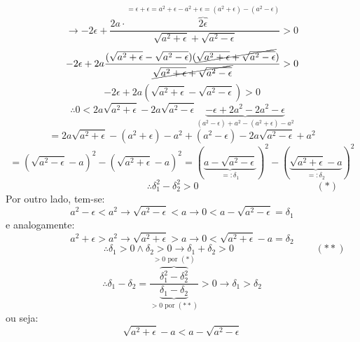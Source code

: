 \documentclass[a4paper, 12pt]{article}
\begin{document}
     \[
     \rightarrow -2\epsilon + \frac{2a \cdot \overbrace{2\epsilon}^{= \epsilon + \epsilon = a^2+\epsilon - a^2+\epsilon = (a^2+\epsilon) - (a^2 - \epsilon)}}{\sqrt{a^2+\epsilon} + \sqrt{a^2-\epsilon}} > 0
     \]
     \[
     -2\epsilon + 2a \frac{(\sqrt{a^2+\epsilon} - \sqrt{a^2-\epsilon} )(\cancel{\sqrt{a^2+\epsilon} + \sqrt{a^2-\epsilon}})}{\cancel{\sqrt{a^2+\epsilon} + \sqrt{a^2-\epsilon}}} > 0
     \]
     \[
     -2\epsilon + 2a (\sqrt{a^2+\epsilon} - \sqrt{a^2-\epsilon}) > 0
     \]
     \[
     \therefore 0 < 2a\sqrt{a^2+\epsilon} - 2a\sqrt{a^2-\epsilon} \underbrace{- \epsilon + 2a^2 - 2a^2 - \epsilon}_{(a^2-\epsilon)+a^2 - (a^2+\epsilon) - a^2}
     \]
     \[
     = 2a\sqrt{a^2+\epsilon} - (a^2+\epsilon) - a^2 + (a^2-\epsilon) - 2a\sqrt{a^2-\epsilon} + a^2
     \]
     \[
     = (\sqrt{a^2-\epsilon} - a)^2 - (\sqrt{a^2+\epsilon} - a)^2 = (\underbrace{a - \sqrt{a^2-\epsilon}}_{=:\delta_1})^2 - (\underbrace{\sqrt{a^2+\epsilon} - a}_{=:\delta_2})^2
     \]
     \[
     \hspace{148pt} \therefore \boxed{\delta_1^2 - \delta_2^2 > 0} \hspace{144pt} (*)
     \]
     Por outro lado, tem-se:
     \[
     a^2-\epsilon < a^2 \rightarrow \sqrt{a^2-\epsilon} < a \rightarrow 0 < a - \sqrt{a^2-\epsilon} = \delta_1
     \] 
     e analogamente:
     \[
     a^2+\epsilon > a^2 \rightarrow \sqrt{a^2+\epsilon} > a \rightarrow 0 < \sqrt{a^2+\epsilon} - a = \delta_2
     \]
     \[
     \hspace{104pt} \therefore \delta_1 > 0 \wedge \delta_2 > 0 \rightarrow \delta_1 + \delta_2 > 0 \hspace{100pt} (**)
     \]
     \[
     \therefore \delta_1 - \delta_2 = \frac{\overbrace{\delta_1^2 - \delta_2^2}^{> 0 \text{ por } (*)}}{\underbrace{\delta_1 - \delta_2}_{> 0 \text{ por } (**)}} > 0 \rightarrow \delta_1 > \delta_2
     \]
     ou seja:
     \[
     \boxed{\sqrt{a^2+\epsilon} - a < a - \sqrt{a^2-\epsilon}}
     \]
\end{document}
